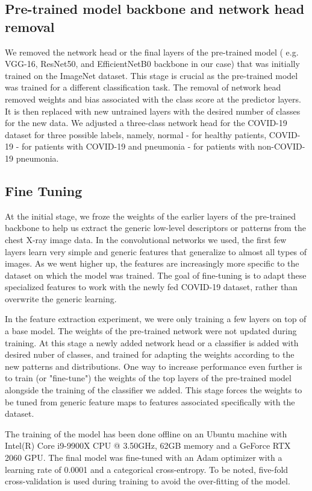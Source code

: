  \subsection{Pre-trained model backbone and network head removal}

We removed the network head or the final layers of the pre-trained model ( e.g. VGG-16, ResNet50, and EfficientNetB0 backbone in our case) that was initially trained on the ImageNet dataset. This stage is crucial as the pre-trained model was trained for a different classification task. The removal of network head removed weights and bias associated with the class score at the predictor layers.
It is then replaced with new untrained layers with the desired number of classes for the new data. We adjusted a three-class network head for the COVID-19 dataset for three possible labels, namely, normal - for healthy patients, COVID-19 - for patients with COVID-19 and pneumonia - for patients with non-COVID-19 pneumonia. 
 

 \subsection{Fine Tuning}
 At the initial stage, we froze the weights of the earlier layers of the pre-trained backbone to help us extract the generic low-level descriptors or patterns from the chest X-ray image data.   In the convolutional networks we used, the first few layers learn very simple and generic features that generalize to almost all types of images. As we went higher up, the features are increasingly more specific to the dataset on which the model was trained. The goal of fine-tuning is to adapt these specialized features to work with the newly fed COVID-19 dataset, rather than overwrite the generic learning.
 
 In the feature extraction experiment, we were only training a few layers on top of a base model. The weights of the pre-trained network were not updated during training.
At this stage a newly added network head or a classifier is added with desired nuber of classes, and trained for adapting the weights according to the new patterns and distributions. One way to increase performance even further is to train (or "fine-tune") the weights of the top layers of the pre-trained model alongside the training of the classifier we added. This stage forces the weights to be tuned from generic feature maps to features associated specifically with the dataset.
 
 The training of the model has been done offline on an Ubuntu machine with Intel(R) Core i9-9900X CPU @ 3.50GHz, 62GB memory and a GeForce RTX 2060 GPU. The final model was fine-tuned with an Adam optimizer with a learning rate of 0.0001 and a categorical cross-entropy. To be noted, five-fold cross-validation is used during training to avoid the over-fitting of the model. 


